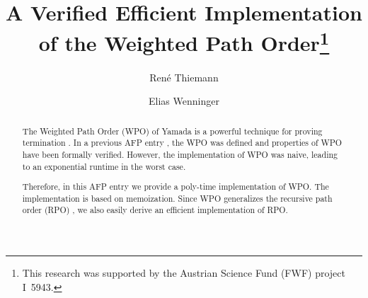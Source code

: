 \documentclass[11pt,a4paper]{article}
\begin{document}
\title{A Verified Efficient Implementation of the Weighted Path Order\footnote{This research was supported by the Austrian Science Fund (FWF) project I~5943.}}
\author{Ren\'e Thiemann}
\author{Elias Wenninger}
\maketitle

\begin{abstract}
The Weighted Path Order (WPO) of Yamada is a powerful technique for proving
termination \cite{WPO_form_paper,WPO-PPDP,WPO}. In a previous AFP entry \cite{WPO_AFP}, the WPO was defined and properties
of WPO have been formally verified. However, the implementation of WPO was naive, leading 
to an exponential runtime in the worst case.

Therefore, in this AFP entry we provide a poly-time implementation of WPO.
The implementation is based on memoization. Since WPO generalizes the recursive path order (RPO) \cite{RPO},
we also easily derive an efficient implementation of RPO.
\end{abstract}

\tableofcontents








\end{document}
